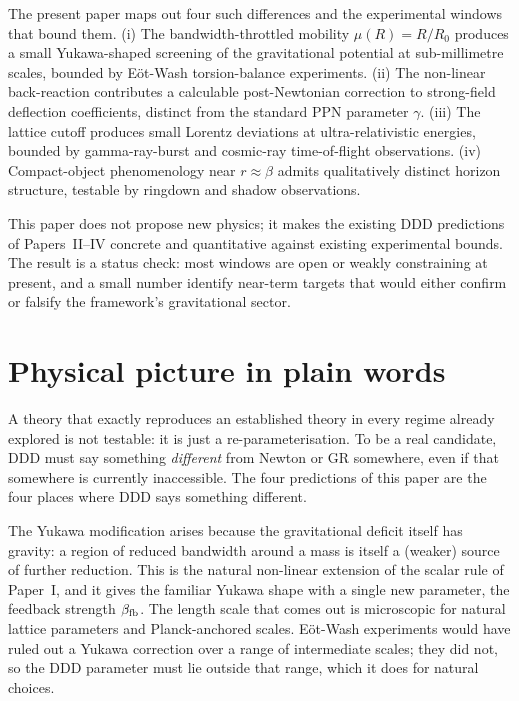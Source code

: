 \documentclass[11pt,a4paper]{article}
\begin{document}
The present paper maps out four such differences and the
experimental windows that bound them. (i) The bandwidth-throttled
mobility $\mu(R) = R/R_0$ produces a small Yukawa-shaped screening of
the gravitational potential at sub-millimetre scales, bounded by
Eöt-Wash torsion-balance experiments. (ii) The non-linear back-reaction
contributes a calculable post-Newtonian correction to strong-field
deflection coefficients, distinct from the standard PPN parameter
$\gamma$. (iii) The lattice cutoff produces small Lorentz deviations
at ultra-relativistic energies, bounded by gamma-ray-burst and
cosmic-ray time-of-flight observations. (iv) Compact-object
phenomenology near $r \approx \beta$ admits qualitatively distinct
horizon structure, testable by ringdown and shadow observations.

This paper does not propose new physics; it makes the existing
DDD predictions of Papers~II--IV concrete and quantitative against
existing experimental bounds. The result is a status check: most
windows are open or weakly constraining at present, and a small
number identify near-term targets that would either confirm or
falsify the framework's gravitational sector.


\section{Physical picture in plain words}
\label{sec:picture}

A theory that exactly reproduces an established theory in every regime
already explored is not testable: it is just a re-parameterisation. To
be a real candidate, DDD must say something \emph{different} from
Newton or GR somewhere, even if that somewhere is currently
inaccessible. The four predictions of this paper are the four places
where DDD says something different.

The Yukawa modification arises because the gravitational deficit
itself has gravity: a region of reduced bandwidth around a mass is
itself a (weaker) source of further reduction. This is the natural
non-linear extension of the scalar rule of Paper~I, and it gives the
familiar Yukawa shape with a single new parameter, the feedback
strength $\beta_{\rm fb}$. The length scale that comes out is
microscopic for natural lattice parameters and Planck-anchored
scales. E\"{o}t-Wash experiments would have ruled out a Yukawa
correction over a range of intermediate scales; they did not, so the
DDD parameter must lie outside that range, which it does for natural
choices.
\end{document}
